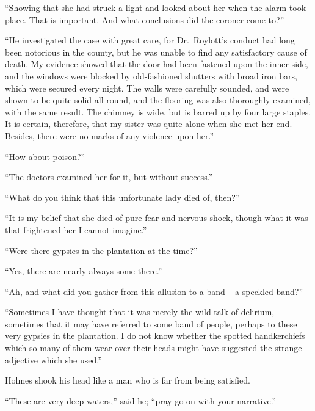 “Showing that she had struck a light and looked about her
when the alarm took place. That is important. And what
conclusions did the coroner come to?”

“He investigated the case with great care, for Dr.\ Roylott’s
conduct had long been notorious in the county, but he was
unable to find any satisfactory cause of death. My evidence
showed that the door had been fastened upon the inner side,
and the windows were blocked by old-fashioned shutters with
broad iron bars, which were secured every night. The walls
were carefully sounded, and were shown to be quite solid all
round, and the flooring was also thoroughly examined, with
the same result. The chimney is wide, but is barred up by
four large staples. It is certain, therefore, that my sister was
quite alone when she met her end. Besides, there were no
marks of any violence upon her.”

“How about poison?”

“The doctors examined her for it, but without success.”

“What do you think that this unfortunate lady died of,
then?”

“It is my belief that she died of pure fear and nervous
shock, though what it was that frightened her I cannot
imagine.”

“Were there gypsies in the plantation at the time?”

“Yes, there are nearly always some there.”

“Ah, and what did you gather from this allusion to a band -- a
speckled band?”

“Sometimes I have thought that it was merely the wild talk
of delirium, sometimes that it may have referred to some band
of people, perhaps to these very gypsies in the plantation. I
do not know whether the spotted handkerchiefs which so
many of them wear over their heads might have suggested the
strange adjective which she used.”

Holmes shook his head like a man who is far from being
satisfied.

“These are very deep waters,” said he; “pray go on with
your narrative.”

